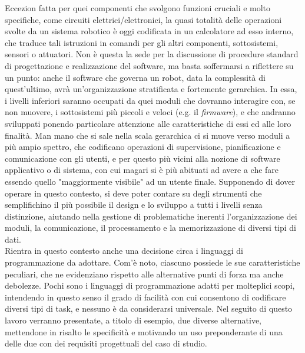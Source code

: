 \indent Eccezion fatta per quei componenti che svolgono funzioni cruciali e molto specifiche, come circuiti elettrici/elettronici, la quasi totalità delle operazioni svolte da un sistema robotico è oggi codificata in un calcolatore ad esso interno, che traduce tali istruzioni in comandi per gli altri componenti, sottosistemi, sensori o attuatori. Non è questa la sede per la discussione di procedure standard di progettazione e realizzazione del software, ma basta soffermarsi a riflettere su un punto: anche il software che governa un robot, data la complessità di quest'ultimo, avrà un'organizzazione stratificata e fortemente gerarchica. In essa, i livelli inferiori saranno occupati da quei moduli che dovranno interagire con, se non muovere, i sottosistemi più piccoli e veloci (e.g. il \emph{firmware}), e che andranno sviluppati ponendo particolare attenzione alle caratteristiche di essi ed alle loro finalità. Man mano che si sale nella scala gerarchica ci si muove verso moduli a più ampio spettro, che codificano operazioni di supervisione, pianificazione e comunicazione con gli utenti, e per questo più vicini alla nozione di software applicativo o di sistema, con cui magari si è più abituati ad avere a che fare essendo quello "maggiormente visibile" ad un utente finale. Supponendo di dover operare in questo contesto, si deve poter contare su degli strumenti che semplifichino il più possibile il design e lo sviluppo a tutti i livelli senza distinzione, aiutando nella gestione di problematiche inerenti l'organizzazione dei moduli, la comunicazione, il processamento e la memorizzazione di diversi tipi di dati.\\
Rientra in questo contesto anche una decisione circa i linguaggi di programmazione da adottare. Com'è noto, ciascuno possiede le sue caratteristiche peculiari, che ne evidenziano rispetto alle alternative punti di forza ma anche debolezze. Pochi sono i linguaggi di programmazione adatti per molteplici scopi, intendendo in questo senso il grado di facilità con cui consentono di codificare diversi tipi di task, e nessuno è da considerarsi universale. Nel seguito di questo lavoro verranno presentate, a titolo di esempio, due diverse alternative, mettendone in risalto le specificità e motivando un uso preponderante di una delle due con dei requisiti progettuali del caso di studio.\newpage

